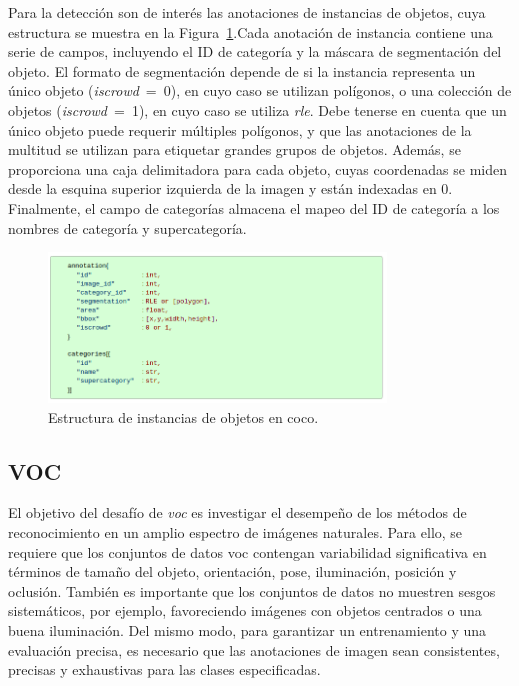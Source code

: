 Para la detección son de interés las anotaciones de instancias de objetos, cuya estructura se muestra en la Figura~\ref{fig.objInst}.Cada anotación de instancia contiene una serie de campos, incluyendo el ID de categoría y la máscara de segmentación del objeto. El formato de segmentación depende de si la instancia representa un único objeto (\textit{iscrowd}~=~0), en cuyo caso se utilizan polígonos, o una colección de objetos (\textit{iscrowd}~=~1), en cuyo caso se utiliza \textit{\acrfull{rle}}. Debe tenerse en cuenta que un único objeto puede requerir múltiples polígonos, y que las anotaciones de la multitud se utilizan para etiquetar grandes grupos de objetos. Además, se proporciona una caja delimitadora para cada objeto, cuyas coordenadas se miden desde la esquina superior izquierda de la imagen y están indexadas en 0. Finalmente, el campo de categorías  almacena el mapeo del ID de categoría a los nombres de categoría y supercategoría.

\begin{figure}[H]
	\begin{center}
		\includegraphics[width=0.8\textwidth]{figures/instancia_objetos.png}
		\caption{Estructura de instancias de objetos en \acrshort{coco}.}
		\label{fig.objInst}
	\end{center}
\end{figure}

\subsection{VOC} \label{sec.voc}
El objetivo del desafío de \textit{\acrfull{voc}} \cite{Everingham10} es investigar el desempeño de los métodos de reconocimiento en un amplio espectro de imágenes naturales. Para ello, se requiere que los conjuntos de datos \acrshort{voc} contengan variabilidad significativa en términos de tamaño del objeto, orientación, pose, iluminación, posición y oclusión. También es importante que los conjuntos de datos no muestren sesgos sistemáticos, por ejemplo, favoreciendo imágenes con objetos centrados o una buena iluminación. Del mismo modo, para garantizar un entrenamiento y una evaluación precisa, es necesario que las anotaciones de imagen sean consistentes, precisas y exhaustivas para las clases especificadas.\\

